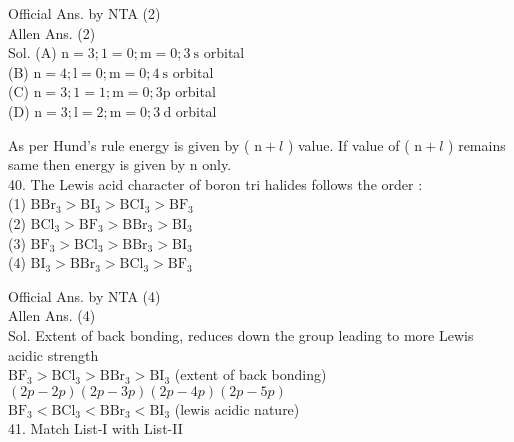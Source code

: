 \documentclass[10pt]{article}
\begin{document}
Official Ans. by NTA (2)\\
Allen Ans. (2)\\
Sol. (A) \(\mathrm{n}=3 ; 1=0 ; \mathrm{m}=0 ; 3 \mathrm{~s}\) orbital\\
(B) \(\mathrm{n}=4 ; \mathrm{l}=0 ; \mathrm{m}=0 ; 4 \mathrm{~s}\) orbital\\
(C) \(\mathrm{n}=3 ; 1=1 ; \mathrm{m}=0 ; 3 \mathrm{p}\) orbital\\
(D) \(\mathrm{n}=3 ; \mathrm{l}=2 ; \mathrm{m}=0 ; 3 \mathrm{~d}\) orbital

As per Hund's rule energy is given by ( \(\mathrm{n}+l\) ) value. If value of ( \(\mathrm{n}+l\) ) remains same then energy is given by n only.\\
40. The Lewis acid character of boron tri halides follows the order :\\
(1) \(\mathrm{BBr}_{3}>\mathrm{BI}_{3}>\mathrm{BCI}_{3}>\mathrm{BF}_{3}\)\\
(2) \(\mathrm{BCl}_{3}>\mathrm{BF}_{3}>\mathrm{BBr}_{3}>\mathrm{BI}_{3}\)\\
(3) \(\mathrm{BF}_{3}>\mathrm{BCl}_{3}>\mathrm{BBr}_{3}>\mathrm{BI}_{3}\)\\
(4) \(\mathrm{BI}_{3}>\mathrm{BBr}_{3}>\mathrm{BCl}_{3}>\mathrm{BF}_{3}\)

Official Ans. by NTA (4)\\
Allen Ans. (4)\\
Sol. Extent of back bonding, reduces down the group leading to more Lewis acidic strength\\
\(\mathrm{BF}_{3}>\mathrm{BCl}_{3}>\mathrm{BBr}_{3}>\mathrm{BI}_{3}\) (extent of back bonding) \((2 p-2 p)(2 p-3 p)(2 p-4 p)(2 p-5 p)\)\\
\(\mathrm{BF}_{3}<\mathrm{BCl}_{3}<\mathrm{BBr}_{3}<\mathrm{BI}_{3}\) (lewis acidic nature)\\
41. Match List-I with List-II
\end{document}
